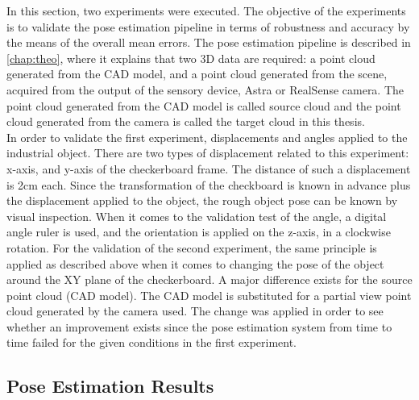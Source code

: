 In this section, two experiments were executed. The objective of the experiments is to validate the pose estimation pipeline in terms of robustness and accuracy by the means of the overall mean errors. The pose estimation pipeline is described in \ref{chap:theo}, where it explains that two 3D data are required: a point cloud generated from the CAD model, and a point cloud generated from the scene, acquired from the output of the sensory device, Astra or RealSense camera. The point cloud generated from the CAD model is called source cloud and the point cloud generated from the camera is called the target cloud in this thesis.\\
In order to validate the first experiment, displacements and angles applied to the industrial object. There are two types of displacement related to this experiment: x-axis, and y-axis of the checkerboard frame. The distance of such a displacement is 2cm each. Since the transformation of the checkboard is known in advance plus the displacement applied to the object, the rough object pose can be known by visual inspection. When it comes to the validation test of the angle, a digital angle ruler is used, and the orientation is applied on the z-axis, in a clockwise rotation. For the validation of the second experiment, the same principle is applied as described above when it comes to changing the pose of the object around the XY plane of the checkerboard. A major difference exists for the source point cloud (CAD model). The CAD model is substituted for a partial view point cloud generated by the camera used. The change was applied in order to see whether an improvement exists since the pose estimation system from time to time failed for the given conditions in the first experiment.

\subsection{Pose Estimation Results}
 
